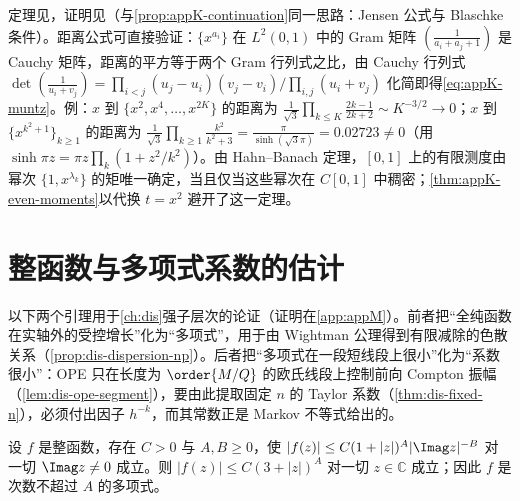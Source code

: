 定理见\cite{Muntz1914,Szasz1916}，证明见\cite[第~15.25--15.27~节]{Rudin1987}（与\cref{prop:appK-continuation}同一思路：Jensen 公式与 Blaschke 条件）。距离公式可直接验证：$\{x^{a_i}\}$ 在 $L^2(0,1)$ 中的 Gram 矩阵 $(\frac1{a_i+a_j+1})$ 是 Cauchy 矩阵，距离的平方等于两个 Gram 行列式之比，由 Cauchy 行列式 $\det(\frac1{u_i+v_j})=\prod_{i<j}(u_j-u_i)(v_j-v_i)/\prod_{i,j}(u_i+v_j)$ 化简即得\cref{eq:appK-muntz}。例：$x$ 到 $\{x^2,x^4,\dots,x^{2K}\}$ 的距离为 $\frac1{\sqrt3}\prod_{k\le K}\frac{2k-1}{2k+2}\sim K^{-3/2}\to0$；$x$ 到 $\{x^{k^2+1}\}_{k\ge1}$ 的距离为 $\frac1{\sqrt3}\prod_{k\ge1}\frac{k^2}{k^2+3}=\frac{\pi}{\sinh(\sqrt3\pi)}=0.02723\ne0$（用 $\sinh\pi z=\pi z\prod_k(1+z^2/k^2)$）。由 Hahn--Banach 定理，$[0,1]$ 上的有限测度由幂次 $\{1,x^{\lambda_k}\}$ 的矩唯一确定，当且仅当这些幂次在 $C[0,1]$ 中稠密；\cref{thm:appK-even-moments}以代换 $t=x^2$ 避开了这一定理。

\section{整函数与多项式系数的估计}\label{sec:appK-entire}

以下两个引理用于\cref{ch:dis}强子层次的论证（证明在\cref{app:appM}）。前者把“全纯函数在实轴外的受控增长”化为“多项式”，用于由 Wightman 公理得到有限减除的色散关系（\cref{prop:dis-dispersion-np}）。后者把“多项式在一段短线段上很小”化为“系数很小”：OPE 只在长度为 $\order{M/Q}$ 的欧氏线段上控制前向 Compton 振幅（\cref{lem:dis-ope-segment}），要由此提取固定 $n$ 的 Taylor 系数（\cref{thm:dis-fixed-n}），必须付出因子 $h^{-k}$，而其常数正是 Markov 不等式给出的。

\begin{lemma}[受控增长的整函数]\label{lem:appK-entire}
设 $f$ 是整函数，存在 $C>0$ 与 $A,B\ge0$，使 $|f(z)|\le C(1+|z|)^A|\Imag z|^{-B}$ 对一切 $\Imag z\ne0$ 成立。则 $|f(z)|\le C(3+|z|)^A$ 对一切 $z\in\mathbb C$ 成立；因此 $f$ 是次数不超过 $A$ 的多项式。
\end{lemma}

